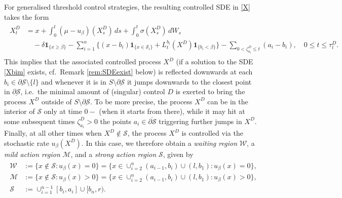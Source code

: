 \documentclass[11pt]{article} %
\numberwithin{komcounter}{section}
\renewcommand{\ul}{\underline}
\newcommand{\ol}{\overline}
\begin{document}
For generalised threshold control strategies, the resulting controlled SDE in \eqref{X} takes the form 
\begin{align} \label{Xbim}
\begin{split}
X_t^{D} 
&= x + \int_0^t (\mu-u_\beta)(X_s^{D}) \, ds + \int_0^t \sigma(X_s^{D}) \, dW_s \\
&\quad - \delta \mathbf{1}_{\{x \geq \beta\}} - \sum_{i=1}^{n} \Big\{ (x-b_i) \mathbf{1}_{\{x \in \mathcal{S}_i\}} + L^{b_i}_t(X^{D})\mathbf{1}_{\{b_i < \beta\}}  \Big\} - \sum_{0 <\zeta^{D}_{a_i} \leq t} (a_i - b_i),  
\quad  0 \leq t \leq \tau^D_l.
\end{split}
\end{align}
This implies that the associated controlled process $X^D$ (if a solution to the SDE \eqref{Xbim} exists, cf.~Remark \ref{rem:SDEexist} below) is reflected downwards at each $b_i \in \ul{\partial \mathcal{S}} \setminus \{l\}$  and whenever it is in $S \setminus \ul{\partial \mathcal{S}}$ it jumps downwards to the closest point in $\ul{\partial \mathcal{S}}$, i.e.~the minimal amount of (singular) control $D$ is exerted to bring the process $X^D$ outside of $S \setminus \ul{\partial \mathcal{S}}$.
To be more precise, the process $X^D$ can be in the interior of $\mathcal{S}$ only at time $0-$ (when it starts from there), while it may hit at some subsequent times $\zeta^{D}_{a_i} > 0$ the points $a_i \in \ol{\partial \mathcal{S}}$ triggering further jumps in $X^D$.  
Finally, at all other times when $X^D \not\in \mathcal{S}$, the process $X^D$ is controlled via the stochastic rate $u_\beta(X^D)$.  
In this case, we therefore obtain a \textit{waiting region} $\mathcal{W}$, a \textit{mild action region} $\mathcal{M}$, and a \textit{strong action region} $\mathcal{S}$, given by 
\begin{align} \label{SiWiMi}
\begin{split}
\mathcal{W} &:= \{x \not\in \mathcal{S} : u_\beta(x) = 0\}
= \{x\in \cup_{i=2}^{n} (a_{i-1}, b_i) \cup (l, b_1) : u_\beta(x) = 0\} , \\
\mathcal{M} &:= \{x \not\in \mathcal{S} : u_\beta(x) > 0\} 
= \{x\in \cup_{i=2}^{n} (a_{i-1}, b_i) \cup (l, b_1) : u_\beta(x) > 0\}, \\
\mathcal{S} &:= \cup_{i=1}^{n-1} [b_i, a_i] \cup [b_{n}, r) .
\end{split}
\end{align}
\end{document}
